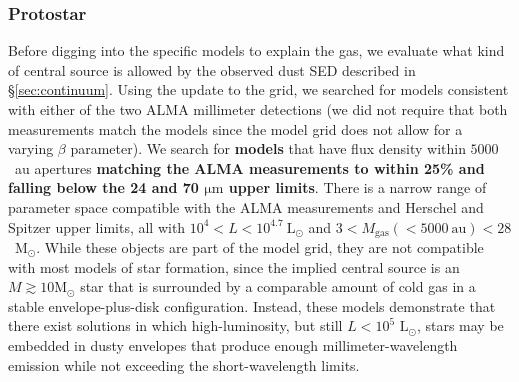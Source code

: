 \documentclass[]{aastex631}
\newcommand{\msun}{\ensuremath{\mathrm{M}_\odot}\xspace}
\newcommand{\lsun}{\ensuremath{\mathrm{L}_\odot}\xspace}
\newcommand{\um}{\ensuremath{\mathrm{\mu m}}\xspace}
\def\rr#1{\textbf{#1}}
\begin{document}
\subsubsection{Protostar}
\label{sec:protostar}
Before digging into the specific models to explain the gas, we evaluate what kind of central source is allowed by the observed dust SED described in \S \ref{sec:continuum}.
Using the \citet{Richardson2024} update to the \citet{Robitaille2017} grid, we searched for models consistent with either of the two ALMA millimeter detections (we did not require that both measurements match the models since the model grid does not allow for a varying $\beta$ parameter).
We search for \rr{models} that have flux density within $5000$~au apertures \rr{matching the ALMA measurements to within 25\% and falling below the 24 and 70 \um upper limits}.
There is a narrow range of parameter space compatible with the ALMA measurements and Herschel and Spitzer upper limits, all with $10^4 < L < 10^{4.7}~\lsun$ and $3<M_{\mathrm{gas}}(<5000~\mathrm{au})<28$~\msun.
While these objects are part of the model grid, they are not compatible with most models of star formation, since the implied central source is an $M\gtrsim10\msun$ star that is surrounded by a comparable amount of cold gas in a stable envelope-plus-disk configuration.
Instead, these models demonstrate that there exist solutions in which high-luminosity, but still $L<10^5$ \lsun, stars may be embedded in dusty envelopes that produce enough millimeter-wavelength emission while not exceeding the short-wavelength limits.
\end{document}
